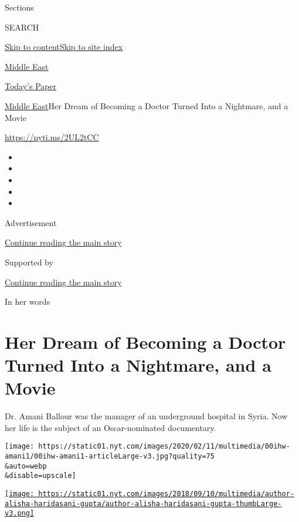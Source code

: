 Sections

SEARCH

\protect\hyperlink{site-content}{Skip to
content}\protect\hyperlink{site-index}{Skip to site index}

\href{https://www.nytimes.com/section/world/middleeast}{Middle East}

\href{https://myaccount.nytimes.com/auth/login?response_type=cookie\&client_id=vi}{}

\href{https://www.nytimes.com/section/todayspaper}{Today's Paper}

\href{/section/world/middleeast}{Middle East}\textbar{}Her Dream of
Becoming a Doctor Turned Into a Nightmare, and a Movie

\href{https://nyti.ms/2UL2tCC}{https://nyti.ms/2UL2tCC}

\begin{itemize}
\item
\item
\item
\item
\item
\end{itemize}

Advertisement

\protect\hyperlink{after-top}{Continue reading the main story}

Supported by

\protect\hyperlink{after-sponsor}{Continue reading the main story}

In her words

\hypertarget{her-dream-of-becoming-a-doctor-turned-into-a-nightmare-and-a-movie}{%
\section{Her Dream of Becoming a Doctor Turned Into a Nightmare, and a
Movie}\label{her-dream-of-becoming-a-doctor-turned-into-a-nightmare-and-a-movie}}

Dr. Amani Ballour was the manager of an underground hospital in Syria.
Now her life is the subject of an Oscar-nominated documentary.

\texttt{[image: https://static01.nyt.com/images/2020/02/11/multimedia/00ihw-amani1/00ihw-amani1-articleLarge-v3.jpg?quality=75\\\&auto=webp\\\&disable=upscale]}

\href{https://www.nytimes.com/by/alisha-haridasani-gupta}{\texttt{[image: https://static01.nyt.com/images/2018/09/10/multimedia/author-alisha-haridasani-gupta/author-alisha-haridasani-gupta-thumbLarge-v3.png]}}


